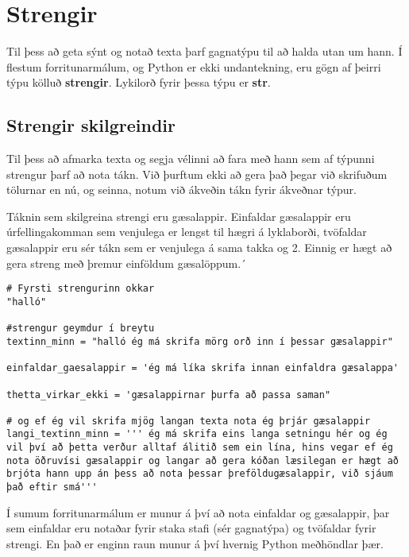 \chapter{Strengir}\label{k:strengir}
Til þess að geta sýnt og notað texta þarf gagnatýpu til að halda utan um hann. Í flestum forritunarmálum, og Python er ekki undantekning, eru gögn af þeirri týpu kölluð \textbf{strengir}.
Lykilorð fyrir þessa týpu er \textbf{str}.

\section{Strengir skilgreindir}
Til þess að afmarka texta og segja vélinni að fara með hann sem af týpunni strengur þarf að nota tákn.
Við þurftum ekki að gera það þegar við skrifuðum tölurnar en nú, og seinna, notum við ákveðin tákn fyrir ákveðnar týpur.

Táknin sem skilgreina strengi eru gæsalappir.
Einfaldar gæsalappir eru úrfellingakomman sem venjulega er lengst til hægri á lyklaborði, tvöfaldar gæsalappir eru sér tákn sem er venjulega á sama takka og 2.
Einnig er hægt að gera streng með þremur einföldum gæsalöppum.´

\begin{lstlisting}[caption=Strengir skilgreindir]
# Fyrsti strengurinn okkar
"halló"

#strengur geymdur í breytu
textinn_minn = "halló ég má skrifa mörg orð inn í þessar gæsalappir"

einfaldar_gaesalappir = 'ég má líka skrifa innan einfaldra gæsalappa'

thetta_virkar_ekki = 'gæsalappirnar þurfa að passa saman" 

# og ef ég vil skrifa mjög langan texta nota ég þrjár gæsalappir
langi_textinn_minn = ''' ég má skrifa eins langa setningu hér og ég vil því að þetta verður alltaf álitið sem ein lína, hins vegar ef ég nota öðruvísi gæsalappir og langar að gera kóðan læsilegan er hægt að brjóta hann upp án þess að nota þessar þreföldugæsalappir, við sjáum það eftir smá'''
\end{lstlisting}

Í sumum forritunarmálum er munur á því að nota einfaldar og gæsalappir, þar sem einfaldar eru notaðar fyrir staka stafi (sér gagnatýpa) og tvöfaldar fyrir strengi.
En það er enginn raun munur á því hvernig Python meðhöndlar þær.

